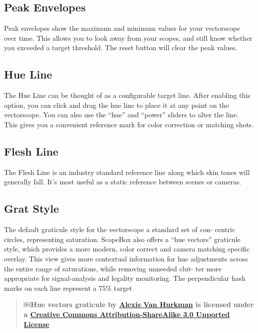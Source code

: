 \documentclass[10,letterpaper,]{report}
\begin{document}
\subsection{Peak Envelopes}

Peak envelopes show the maximum and minimum values for your vectorscope
over time. This allows you to look away from your scopes, and still know
whether you exceeded a target threshold. The reset button will clear the
peak values.

\subsection{Hue Line}

The Hue Line can be thought of as a configurable target line. After
enabling this option, you can click and drag the hue line to place it at
any point on the vectorscope. You can also use the ``hue'' and ``power''
sliders to alter the line. This gives you a convenient reference mark
for color correction or matching shots.

\subsection{Flesh Line}

The Flesh Line is an industry standard reference line along which skin
tones will generally fall. It's most useful as a static reference
between scenes or cameras.

\subsection{Grat Style}

The default graticule style for the vectorscope a standard set of con-
centric circles, representing saturation. ScopeBox also offers a ``hue
vectors'' graticule style, which provides a more modern, color correct
and camera matching specific overlay. This view gives more contextual
information for hue adjustments across the entire range of saturations,
while removing unneeded clut- ter more appropriate for signal-analysis
and legality monitoring. The perpendicular hash marks on each line
represent a 75\% target

\begin{quote}
￼\textbf{Hue vectors graticule by
\href{http://vanhurkman.com/wordpress/?p=2563}{Alexis Van Hurkman} is
licensed under a
\href{http://creativecommons.org/licenses/by-sa/3.0/deed.en_US}{Creative
Commons Attribution-ShareAlike 3.0 Unported License}}
\end{quote}
\end{document}
